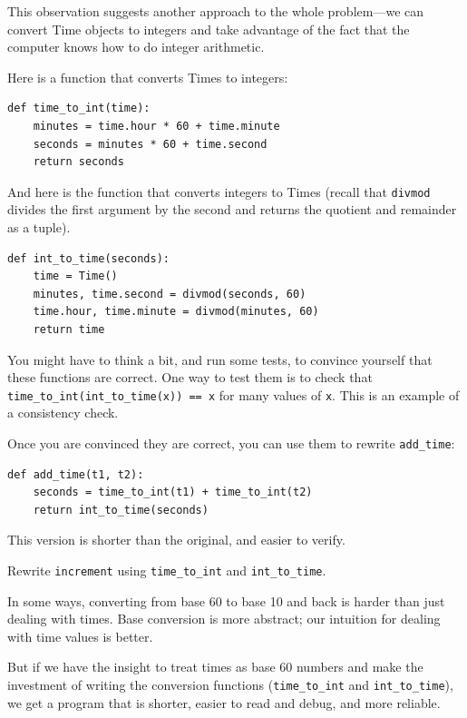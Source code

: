\documentclass[10pt]{book}
\begin{document}
This observation suggests another approach to the whole problem---we
can convert Time objects to integers and take advantage of the fact
that the computer knows how to do integer arithmetic.

Here is a function that converts Times to integers:

\begin{verbatim}
def time_to_int(time):
    minutes = time.hour * 60 + time.minute
    seconds = minutes * 60 + time.second
    return seconds
\end{verbatim}
%
And here is the function that converts integers to Times
(recall that {\tt divmod} divides the first argument by the second
and returns the quotient and remainder as a tuple).

\begin{verbatim}
def int_to_time(seconds):
    time = Time()
    minutes, time.second = divmod(seconds, 60)
    time.hour, time.minute = divmod(minutes, 60)
    return time
\end{verbatim}
%
You might have to think a bit, and run some tests, to convince
yourself that these functions are correct.  One way to test them is to
check that \verb"time_to_int(int_to_time(x)) == x" for many values of
{\tt x}.  This is an example of a consistency check.

Once you are convinced they are correct, you can use them to
rewrite \verb"add_time":

\begin{verbatim}
def add_time(t1, t2):
    seconds = time_to_int(t1) + time_to_int(t2)
    return int_to_time(seconds)
\end{verbatim}
%
This version is shorter than the original, and easier to verify.

\begin{exercise}

Rewrite {\tt increment} using \verb"time_to_int" and \verb"int_to_time".

\end{exercise}

In some ways, converting from base 60 to base 10 and back is harder
than just dealing with times.  Base conversion is more abstract; our
intuition for dealing with time values is better.

But if we have the insight to treat times as base 60 numbers and make
the investment of writing the conversion functions (\verb"time_to_int"
and \verb"int_to_time"), we get a program that is shorter, easier to
read and debug, and more reliable.
\end{document}
